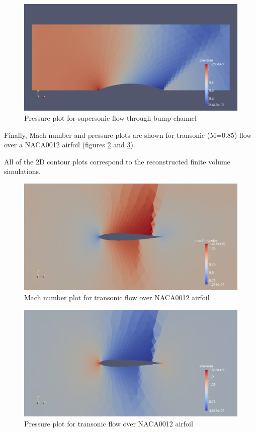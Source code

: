 \documentclass[letterpaper,twoside,12pt]{article}
\begin{document}
\begin{figure}[!H]
\centering
\includegraphics[scale=.25]{bump-2-pressure}
\caption{Pressure plot for supersonic flow through bump channel}
\label{bump-pressure}
\end{figure}

Finally, Mach number and pressure plots are shown for transonic (M=0.85) flow over a NACA0012 airfoil (figures \ref{naca-mach} and \ref{naca-pressure}).

All of the 2D contour plots correspond to the reconstructed finite volume simulations.

\begin{figure}[!H]
	\centering
	\includegraphics[scale=.25]{naca12-2-mach}
	\caption{Mach number plot for transonic flow over NACA0012 airfoil}
	\label{naca-mach}
\end{figure}

\begin{figure}[!H]
	\centering
	\includegraphics[scale=.25]{naca12-2-pressure}
	\caption{Pressure plot for transonic flow over NACA0012 airfoil}
	\label{naca-pressure}
\end{figure}
\end{document}
